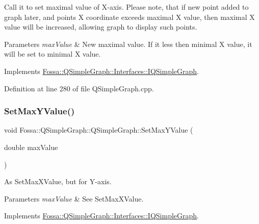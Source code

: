 Call it to set maximal value of X-\/axis. Please note, that if new point added to graph later, and point\textquotesingle{}s X coordinate exceeds maximal X value, then maximal X value will be increased, allowing graph to display such points. 


\begin{DoxyParams}{Parameters}
{\em max\+Value} & New maximal value. If it less then minimal X value, it will be set to minimal X value. \\
\hline
\end{DoxyParams}


Implements \hyperlink{class_fossa_1_1_q_simple_graph_1_1_interfaces_1_1_i_q_simple_graph_a04e7ec46c2be46257bef53c7bf978a2a}{Fossa\+::\+Q\+Simple\+Graph\+::\+Interfaces\+::\+I\+Q\+Simple\+Graph}.



Definition at line 280 of file Q\+Simple\+Graph.\+cpp.

\mbox{\label{class_fossa_1_1_q_simple_graph_1_1_q_simple_graph_a6cb6eee80dc489f300e32263833cf1cd}} 
\subsubsection{\texorpdfstring{Set\+Max\+Y\+Value()}{SetMaxYValue()}}
{\footnotesize\ttfamily void Fossa\+::\+Q\+Simple\+Graph\+::\+Q\+Simple\+Graph\+::\+Set\+Max\+Y\+Value (\begin{DoxyParamCaption}\item[{double}]{max\+Value }\end{DoxyParamCaption})\hspace{0.3cm}{\ttfamily [virtual]}}



As Set\+Max\+X\+Value, but for Y-\/axis. 


\begin{DoxyParams}{Parameters}
{\em max\+Value} & See Set\+Max\+X\+Value. \\
\hline
\end{DoxyParams}


Implements \hyperlink{class_fossa_1_1_q_simple_graph_1_1_interfaces_1_1_i_q_simple_graph_a09e04c116810e79ca1663d2075477746}{Fossa\+::\+Q\+Simple\+Graph\+::\+Interfaces\+::\+I\+Q\+Simple\+Graph}.



